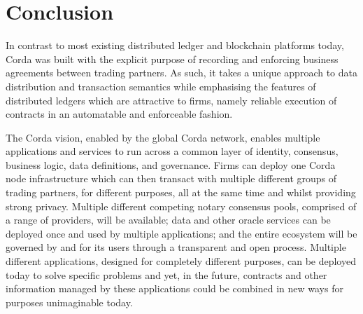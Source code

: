 \documentclass{article}
\begin{document}
\section{Conclusion}

In contrast to most existing distributed ledger and blockchain platforms today, Corda was built with the explicit purpose of recording and enforcing business agreements between trading partners. As such, it takes a unique approach to data distribution and transaction semantics while emphasising the features of distributed ledgers which are attractive to firms, namely reliable execution of contracts in an automatable and enforceable fashion.

The Corda vision, enabled by the global Corda network, enables multiple applications and services to run across a common layer of identity, consensus, business logic, data definitions, and governance. Firms can deploy one Corda node infrastructure which can then transact with multiple different groups of trading partners, for different purposes, all at the same time and whilst providing strong privacy. Multiple different competing notary consensus pools, comprised of a range of providers, will be available; data and other oracle services can be deployed once and used by multiple applications; and the entire ecosystem will be governed by and for its users through a transparent and open process.  Multiple different applications, designed for completely different purposes, can be deployed today to solve specific problems and yet, in the future, contracts and other information managed by these applications could be combined in new ways for purposes unimaginable today.




\end{document}
